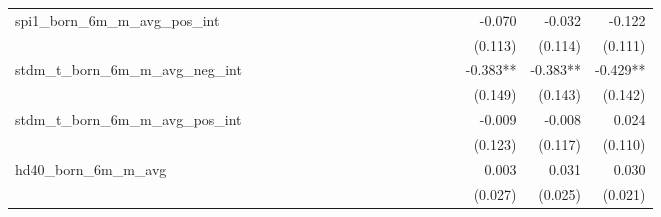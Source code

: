 \begin{tabular}{lrrrrrrrrrrrrrrrrrr}
spi1\_born\_6m\_m\_avg\_pos\_int            &             &             &             &             &             &             &             &             &             &             &             &             &             &             &             &      -0.070 &      -0.032 &      -0.122 \\ 
                                            &             &             &             &             &             &             &             &             &             &             &             &             &             &             &             &     (0.113) &     (0.114) &     (0.111) \\ 
stdm\_t\_born\_6m\_m\_avg\_neg\_int         &             &             &             &             &             &             &             &             &             &             &             &             &             &             &             &    -0.383** &    -0.383** &    -0.429** \\ 
                                            &             &             &             &             &             &             &             &             &             &             &             &             &             &             &             &     (0.149) &     (0.143) &     (0.142) \\ 
stdm\_t\_born\_6m\_m\_avg\_pos\_int         &             &             &             &             &             &             &             &             &             &             &             &             &             &             &             &      -0.009 &      -0.008 &       0.024 \\ 
                                            &             &             &             &             &             &             &             &             &             &             &             &             &             &             &             &     (0.123) &     (0.117) &     (0.110) \\ 
hd40\_born\_6m\_m\_avg                      &             &             &             &             &             &             &             &             &             &             &             &             &             &             &             &       0.003 &       0.031 &       0.030 \\ 
                                            &             &             &             &             &             &             &             &             &             &             &             &             &             &             &             &     (0.027) &     (0.025) &     (0.021) \\ 

\end{tabular}
